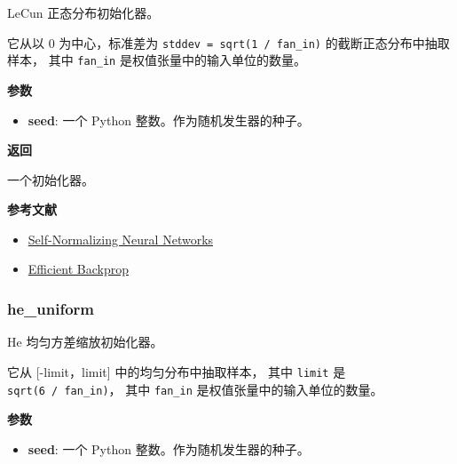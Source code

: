 \begin{Shaded}
\begin{Highlighting}[]
\OperatorTok{=}\NormalTok{)}
\end{Highlighting}
\end{Shaded}

LeCun 正态分布初始化器。

它从以 0 为中心，标准差为 \texttt{stddev\ =\ sqrt(1\ /\ fan\_in)}
的截断正态分布中抽取样本， 其中 \texttt{fan\_in}
是权值张量中的输入单位的数量。

\textbf{参数}

\begin{itemize}
\tightlist
\item
  \textbf{seed}: 一个 Python 整数。作为随机发生器的种子。
\end{itemize}

\textbf{返回}

一个初始化器。

\textbf{参考文献}

\begin{itemize}
\tightlist
\item
  \href{https://arxiv.org/abs/1706.02515}{Self-Normalizing Neural
  Networks}
\item
  \href{http://yann.lecun.com/exdb/publis/pdf/lecun-98b.pdf}{Efficient
  Backprop}
\end{itemize}



\subsubsection{he\_uniform}\label{heux5funiform}

\begin{Shaded}
\begin{Highlighting}[]
\OperatorTok{=}\NormalTok{)}
\end{Highlighting}
\end{Shaded}

He 均匀方差缩放初始化器。

它从 {[}-limit，limit{]} 中的均匀分布中抽取样本， 其中 \texttt{limit} 是
\texttt{sqrt(6\ /\ fan\_in)}， 其中 \texttt{fan\_in}
是权值张量中的输入单位的数量。

\textbf{参数}

\begin{itemize}
\tightlist
\item
  \textbf{seed}: 一个 Python 整数。作为随机发生器的种子。
\end{itemize}

